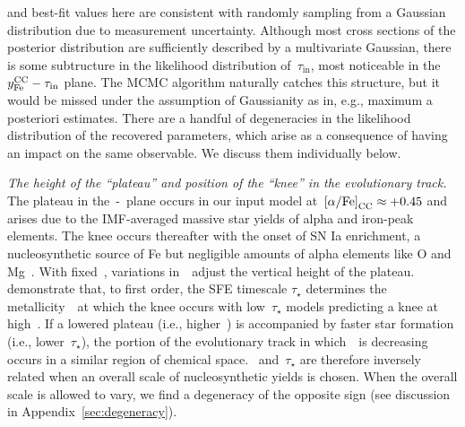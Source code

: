 \documentclass[foo.tex]{subfiles}
\begin{document}
and best-fit values here are consistent with randomly sampling from a Gaussian
distribution due to measurement uncertainty.
Although most cross sections of the posterior distribution are sufficiently
described by a multivariate Gaussian, there is some subtructure in the
likelihood distribution of~$\tau_\text{in}$, most noticeable in the
$y_\text{Fe}^\text{CC} - \tau_\text{in}$ plane.
The MCMC algorithm naturally catches this structure, but it would be missed
under the assumption of Gaussianity as in, e.g., maximum a posteriori estimates.
There are a handful of degeneracies in the likelihood distribution of the
recovered parameters, which arise as a consequence of having an impact on the
same observable.
We discuss them individually below.
\par
\textit{The height of the ``plateau'' and position of the ``knee'' in the
evolutionary track.}
The plateau in the~\afe-\feh~plane occurs in our input model
at~$\text{[$\alpha$/Fe]}_\text{CC} \approx +0.45$ and arises due to the IMF-averaged massive
star yields of alpha and iron-peak elements.
The knee occurs thereafter with the onset of SN Ia enrichment, a
nucleosynthetic source of Fe but negligible amounts of alpha elements like O
and Mg~\citep{Johnson2019}.
With fixed~\yacc, variations in~\yfecc~adjust the vertical height of the
plateau.
\citet{Weinberg2017} demonstrate that, to first order, the SFE timescale
$\tau_\star$ determines the metallicity~\feh~at which the knee occurs with
low~$\tau_\star$ models predicting a knee at high~\feh.
If a lowered plateau (i.e., higher~\yfecc) is accompanied by faster star
formation (i.e., lower~$\tau_\star$), the portion of the evolutionary track
in which~\afe~is decreasing occurs in a similar region of chemical space.
\yfecc~and~$\tau_\star$ are therefore inversely related when an overall scale
of nucleosynthetic yields is chosen.
When the overall scale is allowed to vary, we find a degeneracy of the opposite
sign (see discussion in Appendix~\ref{sec:degeneracy}).
\par
\end{document}
